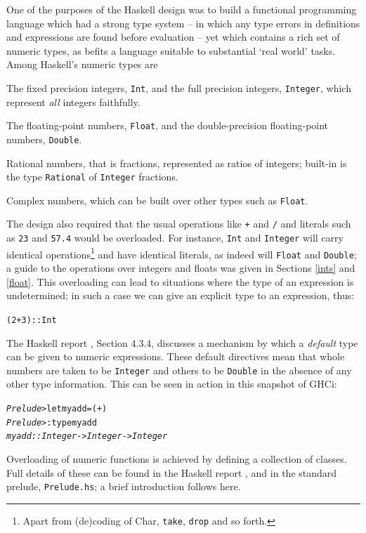 One of the purposes of the Haskell
design was to build a functional programming language
which had a strong type system -- in which any type errors in definitions and
expressions are found before evaluation -- yet which contains a rich set of
numeric types, as befits a language suitable to substantial `real world' tasks.
Among Haskell's numeric types are 
\begin{titemize} 
\item The fixed precision integers, \texttt{Int}, and the full precision
integers, \texttt{Integer}, which represent {\em all\/} integers faithfully.
\item The floating-point numbers, \texttt{Float}, and the double-precision
floating-point numbers, \texttt{Double}.
\item Rational numbers, that is fractions, represented as ratios of integers;
built-in is the type \texttt{Rational} of \texttt{Integer} fractions.
\item Complex numbers, which can be built over other types such as 
\texttt{Float}.
\end{titemize}
The design also required that the usual operations like \texttt{+} and \texttt{/}
and literals such as \texttt{23} and \texttt{57.4} would be overloaded. For
instance, \texttt{Int} and \texttt{Integer} will carry identical
operations\footnote{Apart from (de)coding of {\smtt Char}, \texttt{take}, \texttt{drop}
and so forth.} and have
identical literals, as indeed will \texttt{Float} and \texttt{Double}; a guide to
the operations over integers and floats was given in Sections \ref{ints} and
\ref{float}. This
overloading can lead to situations  where the type of an expression is
undetermined; in such a case we can give an explicit type to an expression,
thus:
\begin{alltt}
(2+3)::Int
\end{alltt}
The Haskell report \cite{haskell2010}, Section 4.3.4, discusses a mechanism by which
a \emph{default} type can be given to numeric expressions.\label{ambiguity} These default directives mean that whole numbers are taken to be \texttt{Integer} and others to be \texttt{Double} in the absence of any other type information. This can be seen in action in this snapshot of GHCi:
\begin{alltt}
\textsl{Prelude>} let myadd = (+)
\textsl{Prelude>} :type myadd
\textsl{myadd :: Integer -> Integer -> Integer}
\end{alltt}
Overloading of numeric functions is achieved by defining a collection of classes. 
Full details of
these can be found in the Haskell report \cite{haskell2010}, and in the standard
prelude, \texttt{Prelude.hs}; a
brief introduction follows here.

